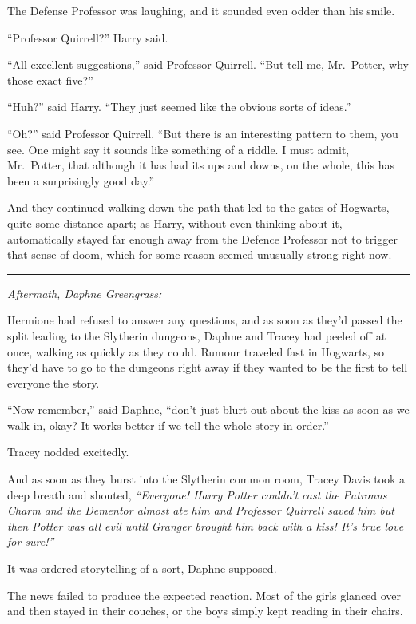 The Defense Professor was laughing, and it sounded even odder than his
smile.

``Professor Quirrell?'' Harry said.

``All excellent suggestions,'' said Professor Quirrell. ``But tell me,
Mr.~Potter, why those exact five?''

``Huh?'' said Harry. ``They just seemed like the obvious sorts of
ideas.''

``Oh?'' said Professor Quirrell. ``But there is an interesting pattern
to them, you see. One might say it sounds like something of a riddle. I
must admit, Mr.~Potter, that although it has had its ups and downs, on
the whole, this has been a surprisingly good day.''

And they continued walking down the path that led to the gates of
Hogwarts, quite some distance apart; as Harry, without even thinking
about it, automatically stayed far enough away from the Defence
Professor not to trigger that sense of doom, which for some reason
seemed unusually strong right now.

\begin{center}\rule{3in}{0.4pt}\end{center}

\emph{Aftermath, Daphne Greengrass:}

Hermione had refused to answer any questions, and as soon as they'd
passed the split leading to the Slytherin dungeons, Daphne and Tracey
had peeled off at once, walking as quickly as they could. Rumour
traveled fast in Hogwarts, so they'd have to go to the dungeons right
away if they wanted to be the first to tell everyone the story.

``Now remember,'' said Daphne, ``don't just blurt out about the kiss as
soon as we walk in, okay? It works better if we tell the whole story in
order.''

Tracey nodded excitedly.

And as soon as they burst into the Slytherin common room, Tracey Davis
took a deep breath and shouted, \emph{``Everyone! Harry Potter couldn't
cast the Patronus Charm and the Dementor almost ate him and Professor
Quirrell saved him but then Potter was all evil until Granger brought
him back with a kiss! It's true love for sure!''}

It was ordered storytelling of a sort, Daphne supposed.

The news failed to produce the expected reaction. Most of the girls
glanced over and then stayed in their couches, or the boys simply kept
reading in their chairs.

